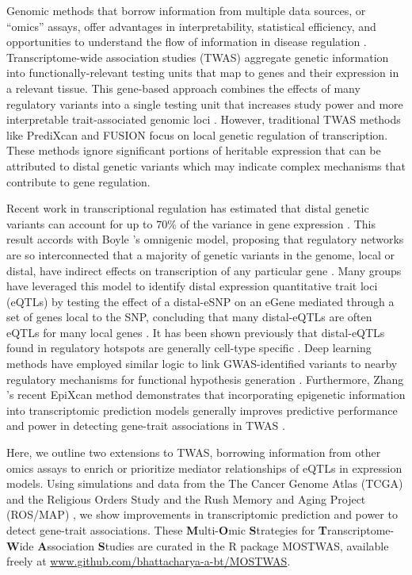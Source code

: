 Genomic methods that borrow information
from multiple data sources, or ``omics'' assays, offer advantages in
interpretability, statistical efficiency, and opportunities
to understand the flow of information in disease regulation
\cite{Hasin2017,Pinu2019}.
Transcriptome-wide association studies (TWAS)
aggregate genetic information
into functionally-relevant testing units that map
to genes and their expression in a relevant tissue.
This gene-based approach combines the effects
of many regulatory variants into 
a single testing unit that increases
study power and more interpretable trait-associated
genomic loci \cite{Gamazon2015,Gusev2016}. However,
traditional TWAS methods like PrediXcan and FUSION
focus on local genetic regulation of
transcription. These
methods ignore significant
portions of heritable
expression that can be attributed
to distal genetic variants
which may indicate complex
mechanisms that contribute
to gene regulation.

Recent work in transcriptional regulation has
estimated that distal genetic variants can account
for up to 70\% of the variance in gene expression 
\cite{Brynedal2017, Liu2019}. This result
accords with Boyle \etal{}'s omnigenic model,
proposing that regulatory networks are so
interconnected that a majority of genetic variants in
the genome, local or distal, have indirect effects on transcription of
any particular gene
\cite{Boyle2017, Liu2019}. Many groups have leveraged
this model to identify distal expression quantitative
trait loci (eQTLs) by testing
the effect of a distal-eSNP on an eGene
mediated through
a set of genes local to the SNP,
concluding that many distal-eQTLs are often
eQTLs for many local genes
\cite{Brown2013IntegrativeEQTLs,He2013Sherlock:GWAS,Pierce2014,Yang2017,Pierce2018Co-occurringMechanisms,Shan2019}.
It has been shown previously that
distal-eQTLs found in regulatory hotspots
are generally cell-type specific \cite{Brown2013IntegrativeEQTLs,Pierce2018Co-occurringMechanisms,vanderWijst2019Single-cellDisease}.
Deep learning methods have employed similar logic
to link GWAS-identified variants to nearby regulatory mechanisms
for functional hypothesis generation \cite{Arloth2020DeepWAS:Learning}.
Furthermore, Zhang \etal{}'s recent EpiXcan method demonstrates
that incorporating epigenetic information into transcriptomic
prediction models generally improves predictive performance
and power in detecting gene-trait associations in TWAS \cite{Zhang2019}.

Here, we outline two extensions to TWAS,
borrowing information from other omics assays to enrich or prioritize
mediator relationships of eQTLs in expression models.
Using simulations and 
data from the The Cancer Genome
Atlas (TCGA) \cite{McLendon2008} 
and the Religious Orders Study and 
the Rush Memory and Aging Project (ROS/MAP) \cite{DeJager2018},
we show improvements in 
transcriptomic prediction
and power to detect
gene-trait associations.
These \textbf{M}ulti-\textbf{O}mic \textbf{S}trategies for \textbf{T}ranscriptome-\textbf{W}ide
\textbf{A}ssociation \textbf{S}tudies are curated in the R package MOSTWAS,
available freely at \url{www.github.com/bhattacharya-a-bt/MOSTWAS}.
